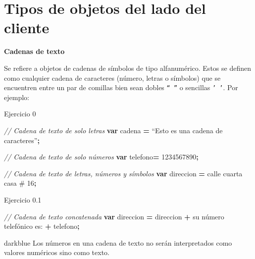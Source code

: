 \documentclass[
  12pt,
  letterpaper,
  twoside]{book}
\newenvironment{Shaded}{\begin{snugshade}}{\end{snugshade}}
\newcommand{\CommentTok}[1]{\textcolor[rgb]{0.56,0.35,0.01}{\textit{#1}}}
\newcommand{\KeywordTok}[1]{\textcolor[rgb]{0.13,0.29,0.53}{\textbf{#1}}}
\newcommand{\NormalTok}[1]{#1}
\newcommand{\OperatorTok}[1]{\textcolor[rgb]{0.81,0.36,0.00}{\textbf{#1}}}
\newcommand{\StringTok}[1]{\textcolor[rgb]{0.31,0.60,0.02}{#1}}
\begin{document}
\hypertarget{tipos-de-objetos-del-lado-del-cliente}{%
\section{Tipos de objetos del lado del cliente}\label{tipos-de-objetos-del-lado-del-cliente}}

\textbf{Cadenas de texto}

Se refiere a objetos de cadenas de símbolos de tipo alfanumérico. Estos se definen como cualquier cadena de caracteres (número, letras o símbolos) que se encuentren entre un par de comillas bien sean dobles \texttt{“\ ”} o sencillas \texttt{’\ ’}. Por ejemplo:

Ejercicio 0

\begin{Shaded}
\begin{Highlighting}[]
\CommentTok{// Cadena de texto de solo letras}
\KeywordTok{var}\NormalTok{ cadena }\OperatorTok{=}\NormalTok{ “Esto es una cadena de caracteres”}\OperatorTok{;}

\CommentTok{// Cadena de texto de solo números}
\KeywordTok{var}\NormalTok{ telefono}\OperatorTok{=} \StringTok{\textquotesingle{}1234567890\textquotesingle{}}\OperatorTok{;}  
                     
\CommentTok{// Cadena de texto de letras, números y símbolos}
\KeywordTok{var}\NormalTok{ direccion }\OperatorTok{=} \StringTok{\textquotesingle{}calle cuarta casa \# 16\textquotesingle{}}\OperatorTok{;}
\end{Highlighting}
\end{Shaded}

Ejercicio 0.1

\begin{Shaded}
\begin{Highlighting}[]
\CommentTok{// Cadena de texto concatenada}
\KeywordTok{var}\NormalTok{ direccion }\OperatorTok{=}\NormalTok{ direccion }\OperatorTok{+} \StringTok{\textquotesingle{} su número telefónico es:\textquotesingle{}} \OperatorTok{+}\NormalTok{ telefono}\OperatorTok{;}
\end{Highlighting}
\end{Shaded}

\begin{bluebox2}

\begin{awesomeblock}{5pt}{\faLightbulb}{darkblue}
Los números en una cadena de texto no serán interpretados como valores numéricos sino como texto.

\end{awesomeblock}

\end{bluebox2}
\end{document}
